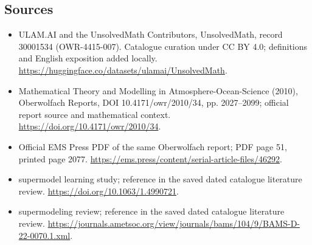 \documentclass[11pt]{article}
\begin{document}
\subsection{Sources}
\begin{itemize}
\item[\hypertarget{source:30001534:1}{S1}] ULAM.AI and the UnsolvedMath Contributors, UnsolvedMath, record 30001534 (OWR-4415-007). Catalogue curation under CC BY 4.0; definitions and English exposition added locally.
\url{https://huggingface.co/datasets/ulamai/UnsolvedMath}.
\item[\hypertarget{source:30001534:2}{S2}] Mathematical Theory and Modelling in Atmosphere-Ocean-Science (2010), Oberwolfach Reports, DOI 10.4171/owr/2010/34, pp. 2027--2099; official report source and mathematical context.
\url{https://doi.org/10.4171/owr/2010/34}.
\item[\hypertarget{source:30001534:3}{S3}] Official EMS Press PDF of the same Oberwolfach report; PDF page 51, printed page 2077.
\url{https://ems.press/content/serial-article-files/46292}.
\item[\hypertarget{source:30001534:4}{S4}] supermodel learning study; reference in the saved dated catalogue literature review.
\url{https://doi.org/10.1063/1.4990721}.
\item[\hypertarget{source:30001534:5}{S5}] supermodeling review; reference in the saved dated catalogue literature review.
\url{https://journals.ametsoc.org/view/journals/bams/104/9/BAMS-D-22-0070.1.xml}.
\end{itemize}
\label{end:30001534}
\end{document}
